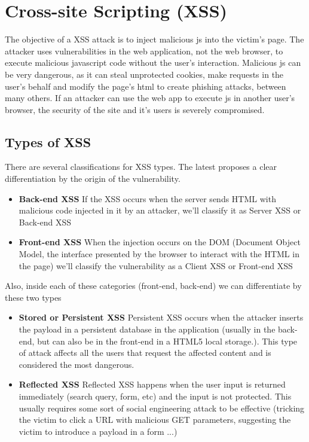 \section{Cross-site Scripting (XSS)}\label{sec:xss}
The objective of a XSS attack is to inject malicious js into the victim's page. The attacker uses vulnerabilities in the web application, not the web browser, to execute malicious javascript code without the user's interaction. Malicious js can be very dangerous, as it can steal unprotected cookies, make requests in the user's behalf and modify the page's html to create phishing attacks, between many others. If an attacker can use the web app to execute js in another user's browser, the security of the site and it's users is severely compromised.

\subsection{Types of XSS}
There are several classifications for XSS types. The latest proposes a clear differentiation by the origin of the vulnerability.

\begin{itemize}
  \item \textbf{Back-end XSS} If the XSS occurs when the server sends HTML with malicious code injected in it by an attacker, we'll classify it as Server XSS or Back-end XSS
  \item \textbf{Front-end XSS} When the injection occurs on the DOM (Document Object Model, the interface presented by the browser to interact with the HTML in the page) we'll classify the vulnerability as a Client XSS or Front-end XSS
\end{itemize}

Also, inside each of these categories (front-end, back-end) we can differentiate by these two types

\begin{itemize}
  \item \textbf{Stored or Persistent XSS} Persistent XSS occurs when the attacker inserts the payload in a persistent database in the application (usually in the back-end, but can also be in the front-end in a HTML5 local storage.). This type of attack affects all the users that request the affected content and is considered the most dangerous.
  
  \item \textbf{Reflected XSS} Reflected XSS happens when the user input is returned immediately (search query, form, etc) and the input is not protected. This usually requires some sort of social engineering attack to be effective (tricking the victim to click a URL with malicious GET parameters, suggesting the victim to introduce a payload in a form ...)
\end{itemize}

